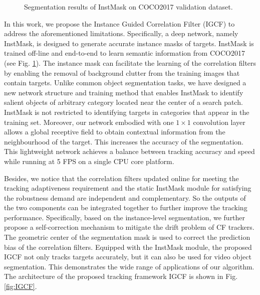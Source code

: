 \documentclass[review]{elsarticle}
\begin{document}
\begin{CJK*}{UTF8}{gbsn}
\begin{figure}
    \caption{Segmentation results of InstMask on COCO2017 \cite{Lin2014MicrosoftCC} validation dataset.}
    \label{fig:InstMask}
\end{figure}

In this work, we propose the Instance Guided Correlation Filter (IGCF) to address the aforementioned limitations. Specifically, a deep network, namely InstMask, is designed to generate accurate instance masks of targets. InstMask is trained off-line and end-to-end to learn semantic information from COCO2017\cite{Lin2014MicrosoftCC} (see Fig. \ref{fig:InstMask}). The instance mask can facilitate the learning of the correlation filters by enabling the removal of background clutter from the training images that contain targets. 
Unlike common object segmentation tasks, we have designed a new network structure and training method that enables InstMask to identify salient objects of arbitrary category located near the center of a search patch. InstMask is not restricted to identifying targets in categories that appear in the training set. Moreover, our network embodied with one $1 \times 1$ convolution layer allows a global receptive field to obtain contextual information from the neighbourhood of the target. This increases the accuracy of the segmentation. This lightweight network achieves a balance between tracking accuracy and speed while running at 5 FPS on a single CPU core platform. 

Besides, we notice that the correlation filters updated online for meeting the tracking adaptiveness requirement and the static InstMask module for satisfying the robustness demand are independent and complementary. So the outputs of the two components can be integrated together to further improve the tracking performance. Specifically, based on the instance-level segmentation, we further propose a self-correction mechanism to mitigate the drift problem of CF trackers. The geometric center of the segmentation mask is used to correct the prediction bias of the correlation filters. Equipped with the InstMask module, the proposed IGCF not only tracks targets accurately, but it can also be used for video object segmentation. This demonstrates the wide range of applications of our algorithm. The architecture of the proposed tracking framework IGCF is shown in Fig. \ref{fig:IGCF}.


\end{CJK*}
\end{document}
